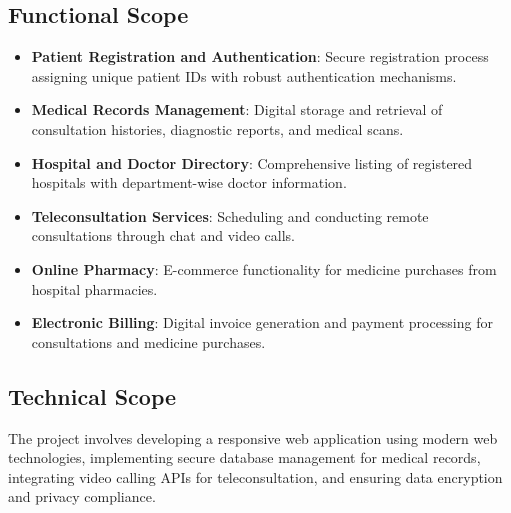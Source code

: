 \subsection{Functional Scope}
\begin{itemize}
    \item \textbf{Patient Registration and Authentication}: Secure registration process assigning unique patient IDs with robust authentication mechanisms.
    \item \textbf{Medical Records Management}: Digital storage and retrieval of consultation histories, diagnostic reports, and medical scans.
    \item \textbf{Hospital and Doctor Directory}: Comprehensive listing of registered hospitals with department-wise doctor information.
    \item \textbf{Teleconsultation Services}: Scheduling and conducting remote consultations through chat and video calls.
    \item \textbf{Online Pharmacy}: E-commerce functionality for medicine purchases from hospital pharmacies.
    \item \textbf{Electronic Billing}: Digital invoice generation and payment processing for consultations and medicine purchases.
\end{itemize}

\subsection{Technical Scope}
The project involves developing a responsive web application using modern web technologies, implementing secure database management for medical records, integrating video calling APIs for teleconsultation, and ensuring data encryption and privacy compliance.
